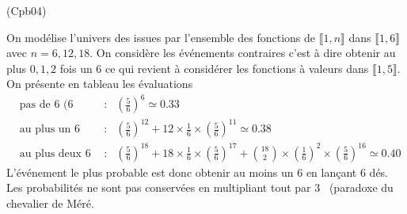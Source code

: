 \begin{tiny}(Cpb04)\end{tiny} On modélise l'univers des issues par l'ensemble des fonctions de $\llbracket 1,n\rrbracket$ dans $\llbracket 1,6 \rrbracket$ avec $n= 6, 12, 18$.\newline
On considère les événements contraires c'est à dire obtenir au plus $0,1,2$ fois un $6$ ce qui revient à considérer les fonctions à valeurs dans $\llbracket 1,5 \rrbracket$.
On présente en tableau les évaluations
\begin{align*}
  &\text{pas de 6 (6 dés)} &:&(\frac{5}{6})^6 \simeq 0.33\\
  &\text{au plus un 6 (12 dés)} &:& (\frac{5}{6})^{12} + 12\times \frac{1}{6}\times(\frac{5}{6})^{11} \simeq 0.38\\
  &\text{au plus deux 6 (18 dés)} &:& (\frac{5}{6})^{18} + 18\times \frac{1}{6}\times(\frac{5}{6})^{17}
+\binom{18}{2}\times (\frac{1}{6})^2\times(\frac{5}{6})^{16}\simeq 0.40
\end{align*}
L'événement le plus probable est donc \og obtenir au moins un 6 en lançant 6 dés\fg.\newline
Les probabilités ne sont pas conservées en \og multipliant tout par $3$\fg~ (paradoxe du chevalier de Méré.
